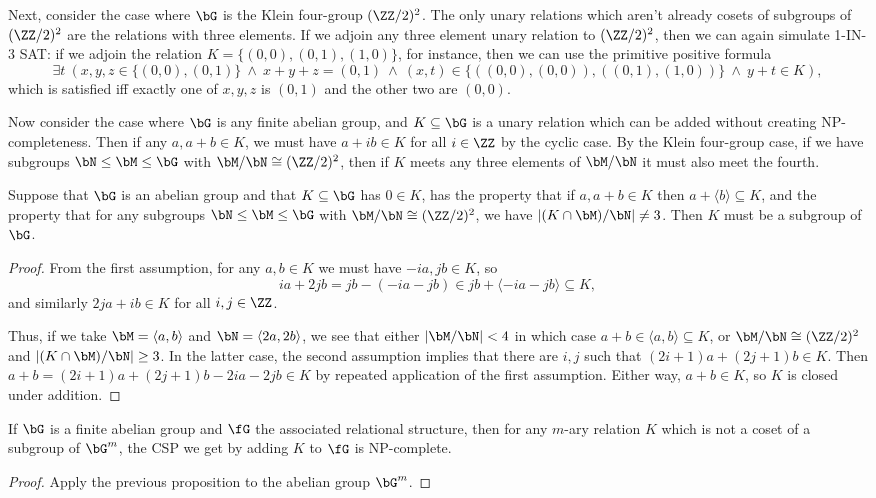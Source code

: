 Next, consider the case where $\bG$ is the Klein four-group $(\ZZ/2)^2$. The only unary relations which aren't already cosets of subgroups of $(\ZZ/2)^2$ are the relations with three elements. If we adjoin any three element unary relation to $(\ZZ/2)^2$, then we can again simulate 1-IN-3 SAT: if we adjoin the relation $K = \{(0,0),(0,1),(1,0)\}$, for instance, then we can use the primitive positive formula
\[
\exists t\ (x,y,z \in \{(0,0),(0,1)\}\ \wedge\ x+y+z = (0,1)\ \wedge\ (x,t) \in \{((0,0),(0,0)), ((0,1),(1,0))\}\ \wedge\ y+t \in K),
\]
which is satisfied iff exactly one of $x,y,z$ is $(0,1)$ and the other two are $(0,0)$.

Now consider the case where $\bG$ is any finite abelian group, and $K \subseteq \bG$ is a unary relation which can be added without creating NP-completeness. Then if any $a,a+b \in K$, we must have $a+ib \in K$ for all $i \in \ZZ$ by the cyclic case. By the Klein four-group case, if we have subgroups $\bN \le \bM \le \bG$ with $\bM/\bN \cong (\ZZ/2)^2$, then if $K$ meets any three elements of $\bM/\bN$ it must also meet the fourth.

\begin{prop} Suppose that $\bG$ is an abelian group and that $K \subseteq \bG$ has $0 \in K$, has the property that if $a,a+b \in K$ then $a+\langle b\rangle \subseteq K$, and the property that for any subgroups $\bN \le \bM \le \bG$ with $\bM/\bN \cong (\ZZ/2)^2$, we have $|(K\cap \bM)/\bN| \ne 3$. Then $K$ must be a subgroup of $\bG$.
\end{prop}
\begin{proof} From the first assumption, for any $a,b \in K$ we must have $-ia, jb \in K$, so
\[
ia+2jb = jb-(-ia-jb) \in jb+\langle -ia - jb\rangle \subseteq K,
\]
and similarly $2ja+ib \in K$ for all $i,j \in \ZZ$.

Thus, if we take $\bM = \langle a,b\rangle$ and $\bN = \langle 2a,2b \rangle$, we see that either $|\bM/\bN| < 4$ in which case $a+b \in \langle a,b \rangle \subseteq K$, or $\bM/\bN \cong (\ZZ/2)^2$ and $|(K\cap \bM)/\bN| \ge 3$. In the latter case, the second assumption implies that there are $i,j$ such that $(2i+1)a+(2j+1)b \in K$. Then $a+b = (2i+1)a+(2j+1)b-2ia-2jb \in K$ by repeated application of the first assumption. Either way, $a+b \in K$, so $K$ is closed under addition.
\end{proof}

\begin{cor} If $\bG$ is a finite abelian group and $\fG$ the associated relational structure, then for any $m$-ary relation $K$ which is not a coset of a subgroup of $\bG^m$, the CSP we get by adding $K$ to $\fG$ is NP-complete.
\end{cor}
\begin{proof} Apply the previous proposition to the abelian group $\bG^m$.
\end{proof}

